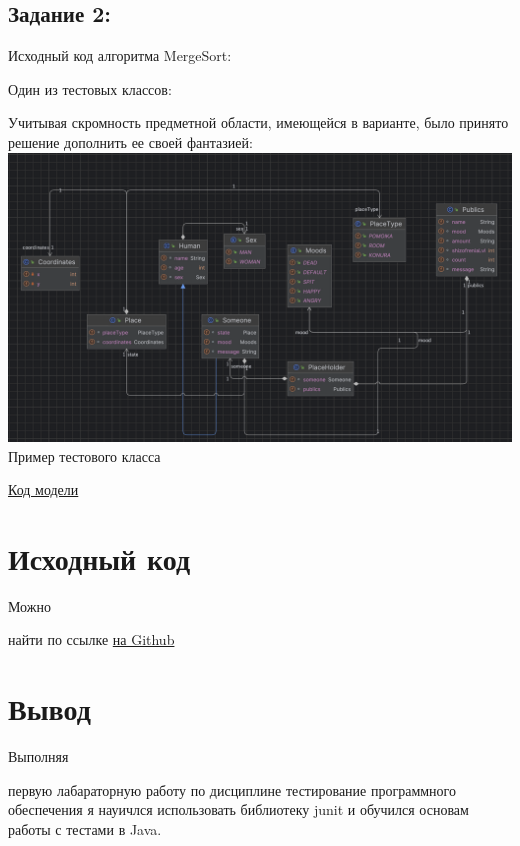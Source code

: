 \subsection{Задание 2:}
Исходный код алгоритма MergeSort:

\newpage
Один из тестовых классов:

Учитывая скромность предметной области, имеющейся в варианте, было принято решение дополнить ее своей фантазией:\\
\includegraphics[scale=0.4]{img/tpo3.png}\\
{Пример тестового класса}

\href{https://github.com/FooolyHARD/Testing-of-Software/blob/36b94ca08662f3774ab9c1f42c43fd15b8e00945/src/main/java/org/senechka/task3}{Код модели}\\
\section{Исходный код}
\hypertarget{p3}{Можно} найти по ссылке \href{https://github.com/FooolyHARD/Testing-of-Software}{на Github}
\section{Вывод}
\hypertarget{p4}{Выполняя} первую лабараторную работу по дисциплине тестирование программного обеспечения я науичлся использовать библиотеку junit и обучился основам работы с тестами в Java.


